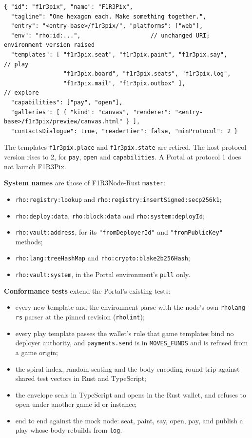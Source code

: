 \documentclass[11pt,a4paper]{article}
\newcommand{\code}[1]{\texttt{#1}}
\begin{document}
\begin{lstlisting}
{ "id": "f1r3pix", "name": "F1R3Pix",
  "tagline": "One hexagon each. Make something together.",
  "entry": "<entry-base>/f1r3pix/", "platforms": ["web"],
  "env": "rho:id:...",                    // unchanged URI; environment version raised
  "templates": [ "f1r3pix.seat", "f1r3pix.paint", "f1r3pix.say",           // play
                 "f1r3pix.board", "f1r3pix.seats", "f1r3pix.log",
                 "f1r3pix.mail", "f1r3pix.outbox" ],                        // explore
  "capabilities": ["pay", "open"],
  "galleries": [ { "kind": "canvas", "renderer": "<entry-base>/f1r3pix/preview/canvas.html" } ],
  "contactsDialogue": true, "readerTier": false, "minProtocol": 2 }
\end{lstlisting}

The templates \code{f1r3pix.place} and \code{f1r3pix.state} are retired. The host protocol
version rises to 2, for \code{pay}, \code{open} and \code{capabilities}. A Portal at protocol 1
does not launch F1R3Pix.

\textbf{System names} are those of F1R3Node-Rust \code{master}:
\begin{itemize}[leftmargin=1.2em,itemsep=0pt]
\item \code{rho:registry:lookup} and \code{rho:registry:\allowbreak insertSigned:\allowbreak secp256k1};
\item \code{rho:deploy:data}, \code{rho:block:data} and \code{rho:system:deployId};
\item \code{rho:vault:address}, for its \code{"fromDeployerId"} and \code{"fromPublicKey"} methods;
\item \code{rho:lang:treeHashMap} and \code{rho:crypto:blake2b256Hash};
\item \code{rho:vault:system}, in the Portal environment's \code{pull} only.
\end{itemize}

\textbf{Conformance tests} extend the Portal's existing tests:

\begin{itemize}[leftmargin=1.2em,itemsep=1pt]
\item every new template and the environment parse with the node's own \code{rholang-rs} parser at
  the pinned revision (\code{rholint});
\item every play template passes the wallet's rule that game templates bind no deployer
  authority, and \code{payments.send} is in \code{MOVES\_FUNDS} and is refused from a game origin;
\item the spiral index, random seating and the body encoding round-trip against shared test
  vectors in Rust and TypeScript;
\item the envelope seals in TypeScript and opens in the Rust wallet, and refuses to open under
  another game id or instance;
\item end to end against the mock node: seat, paint, say, open, pay, and publish a play whose
  body rebuilds from \code{log}.
\end{itemize}
\end{document}
